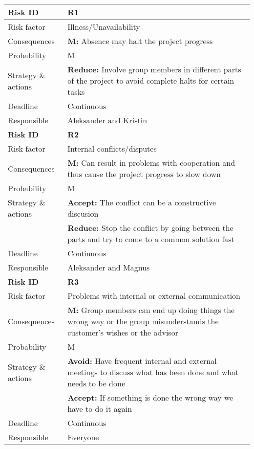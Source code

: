 
\begin{longtable}{>{\setlength\hsize{.3\hsize}}X|>{\setlength\hsize{0.7\hsize}}X}\hline
\textbf{Risk ID} & \textbf{R1} \\ \hline \hline
Risk factor & Illness/Unavailability \\
Consequences & \textbf{M:} Absence may halt the project progress \\
Probability & M \\
Strategy \& actions & \textbf{Reduce:} Involve group members in different parts of the project to avoid complete halts for certain tasks \\
Deadline & Continuous \\
Responsible & Aleksander and Kristin \\ \hline

\newpage

\hline
\textbf{Risk ID} & \textbf{R2} \\ \hline \hline
Risk factor & Internal conflicts/disputes \\
Consequences & \textbf{M:} Can result in problems with cooperation and thus cause the project progress to slow down \\
Probability & M \\
Strategy \& actions & \textbf{Accept:} The conflict can be a constructive discusion\\
 & \textbf{Reduce:} Stop the conflict by going between the parts and try to come to a common solution fast \\
Deadline & Continuous \\
Responsible & Aleksander and Magnus\\ \hline

\textbf{Risk ID} & \textbf{R3} \\ \hline \hline
Risk factor & Problems with internal or external communication \\
Consequences & \textbf{M:} Group members can end up doing things the wrong way or the group misunderstands the customer's wishes or the advisor\\
Probability & M \\
Strategy \& actions & \textbf{Avoid:} Have frequent internal and external meetings to discuss what has been done and what needs to be done\\
 & \textbf{Accept:} If something is done the wrong way we have to do it again \\
Deadline & Continuous \\
Responsible & Everyone \\ \hline


\end{longtable}

